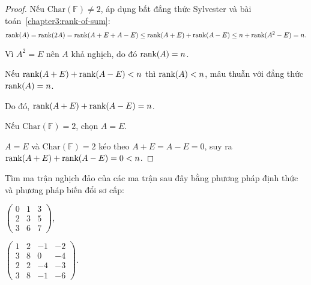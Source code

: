 \documentclass[class=nhvh-linear-algebra,crop=false]{standalone}
\begin{document}
\begin{proof}
    \par Nếu $\text{Char}(\mathbb{F})\ne 2$, áp dụng bất đẳng thức Sylvester và bài toán~\ref{chapter3:rank-of-sum}:
    \[
        \text{rank}(A) = \text{rank}(2A) = \text{rank}(A+E + A-E) \le \text{rank}(A+E) + \text{rank}(A-E) \le n + \text{rank}(A^{2} - E) = n.
    \]
    \par Vì $A^{2} = E$ nên $A$ khả nghịch, do đó $\text{rank}(A) = n$.
    \par Nếu $\text{rank}(A + E) + \text{rank}(A - E) < n$ thì $\text{rank}(A) < n$, mâu thuẫn với đẳng thức $\text{rank}(A) = n$.
    \par Do đó, $\text{rank}(A + E) + \text{rank}(A - E) = n$.
    \bigskip
    \par Nếu $\text{Char}(\mathbb{F}) = 2$, chọn $A = E$.
    \par $A = E$ và $\text{Char}(\mathbb{F}) = 2$ kéo theo $A + E = A - E = 0$, suy ra $\text{rank}(A + E) + \text{rank}(A - E) = 0 < n$.
\end{proof}

\begin{exercise}
    \par Tìm ma trận nghịch đảo của các ma trận sau đây bằng phương pháp định thức và phương pháp biến đổi sơ cấp:
    \begin{center}
        \begin{enumerate*}[label = (\alph*)]
            \item $\begin{pmatrix}
                          0 & 1 & 3 \\
                          2 & 3 & 5 \\
                          3 & 6 & 7
                      \end{pmatrix}$,
            \item $\begin{pmatrix}
                          1 & 2 & -1 & -2 \\
                          3 & 8 & 0  & -4 \\
                          2 & 2 & -4 & -3 \\
                          3 & 8 & -1 & -6
                      \end{pmatrix}$.
        \end{enumerate*}
    \end{center}
\end{exercise}
\end{document}
